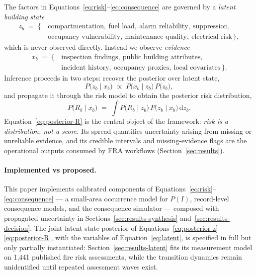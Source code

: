 The factors in Equations~\eqref{eq:risk}--\eqref{eq:consequence} are governed by
a \emph{latent building state}
\begin{equation}
  \begin{aligned}
  z_b \;=\; \{\, &\text{compartmentation},\ \text{fuel load},\
  \text{alarm reliability},\ \text{suppression},\\
  &\text{occupancy vulnerability},\ \text{maintenance quality},\
  \text{electrical risk} \,\},
  \end{aligned}
  \label{eq:latent}
\end{equation}
which is never observed directly. Instead we observe \emph{evidence}
\begin{equation}
  \begin{aligned}
  x_b \;=\; \{\, &\text{inspection findings},\ \text{public building attributes},\\
  &\text{incident history},\ \text{occupancy proxies},\
  \text{local covariates} \,\}.
  \end{aligned}
  \label{eq:evidence}
\end{equation}
Inference proceeds in two steps: recover the posterior over latent state,
\begin{equation}
  P\!\big(z_b \mid x_b\big) \;\propto\;
  P\!\big(x_b \mid z_b\big)\,P\!\big(z_b\big),
  \label{eq:posterior-z}
\end{equation}
and propagate it through the risk model to obtain the posterior risk
distribution,
\begin{equation}
  P\!\big(R_b \mid x_b\big) \;=\;
  \int P\!\big(R_b \mid z_b\big)\,P\!\big(z_b \mid x_b\big)\,\mathrm{d}z_b .
  \label{eq:posterior-R}
\end{equation}
Equation~\eqref{eq:posterior-R} is the central object of the framework: \emph{risk
is a distribution, not a score}. Its spread quantifies uncertainty arising from
missing or unreliable evidence, and its credible intervals and missing-evidence
flags are the operational outputs consumed by FRA workflows
(Section~\ref{sec:results}).

\paragraph{Implemented vs proposed.} This paper implements calibrated components
of Equations~\eqref{eq:risk}--\eqref{eq:consequence} --- a small-area occurrence
model for $P(I)$, record-level consequence models, and the consequence simulator ---
composed with propagated uncertainty in Sections~\ref{sec:results-synthesis}
and~\ref{sec:results-decision}. The joint latent-state posterior of
Equations~\eqref{eq:posterior-z}--\eqref{eq:posterior-R}, with the variables of
Equation~\eqref{eq:latent}, is specified in full but only partially instantiated:
Section~\ref{sec:results-latent} fits its measurement model on 1{,}441 published
fire risk assessments, while the transition dynamics remain unidentified until
repeated assessment waves exist.

